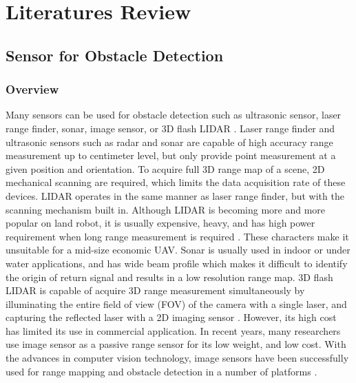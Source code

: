\chapter{Literatures Review}\label{ch:Review}

\section{Sensor for Obstacle Detection}\label{sec:sensor}

\subsection{Overview}\label{sec:SensorOverview}
Many sensors can be used for obstacle detection such as ultrasonic
sensor, laser range finder, sonar, image sensor, or 3D flash LIDAR
\cite{de_angelis_low-cost_2007} \cite{alonge_novel_2009}
\cite{harb_neural_2008} \cite{saad_robust_2011}
\cite{williams_efficient_2001} \cite{chong_feature-based_1999}
\cite{hanna_obstacle_2008} \cite{lu_distance_2010}
\cite{civera_inverse_2008} \cite{jirawimut_visual_2003}
\cite{amzajerdian_lidar_2011} \cite{nieuwenhuisen_obstacle_2014}. Laser
range finder and ultrasonic sensors such as radar and sonar are
capable of high accuracy range measurement up to centimeter level, but
only provide point measurement at a given position and orientation. To
acquire full 3D range map of a scene, 2D mechanical scanning are
required, which limits the data acquisition rate of these devices.
LIDAR operates in the same manner as laser range finder, but with the
scanning mechanism built in. Although LIDAR is becoming more and more
popular on land robot, it is usually expensive, heavy,
\cite{subharsanan_low_2013} and has high power requirement when long
range measurement is required \cite{lemmens_airborne_2007}. These
characters make it unsuitable for a mid-size economic UAV. Sonar is
usually used in indoor or under water applications, and has wide beam
profile which makes it difficult to identify the origin of return
signal and results in a low resolution range map. 3D flash LIDAR is
capable of acquire 3D range measurement simultaneously by illuminating
the entire field of view (FOV) of the camera with a single laser, and
capturing the reflected laser with a 2D imaging sensor
\cite{amzajerdian_lidar_2011}. However, its high cost has limited its
use in commercial application. In recent years, many researchers use
image sensor as a passive range sensor for its low weight, and low
cost. With the advances in computer vision technology, image sensors
have been successfully used for range mapping and obstacle detection
in a number of platforms \cite{einhorn_cant_2010}
\cite{hashimoto_detection_1996} \cite{yamaguchi_moving_2006}
\cite{zhang_obstacle_2012} \cite{maier_self-supervised_2011}
\cite{kubota_global_2007} \cite{xu_method_2009}
\cite{hanna_obstacle_2008} \cite{zhang_real-time_2012}
\cite{van_der_mark_stereo_2007} \cite{broggi_stereo_2011}
\cite{plumet_toward_2014}.


